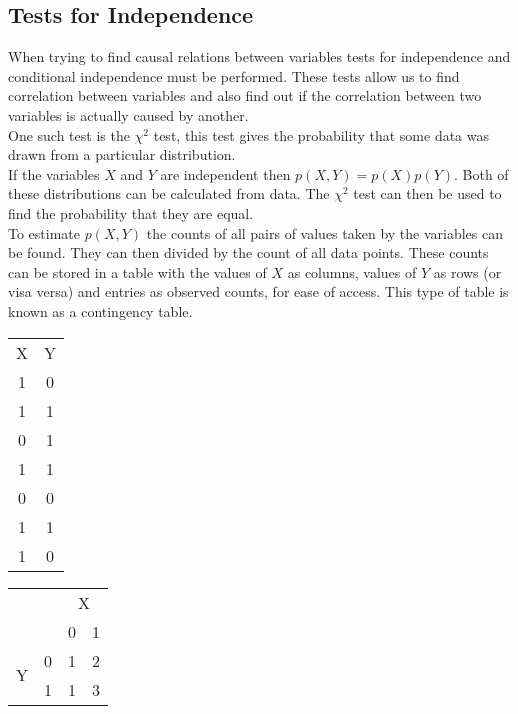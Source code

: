 \documentclass{article}
\begin{document}
\subsection{Tests for Independence}
When trying to find causal relations between variables tests for independence and conditional independence must be performed. These tests allow us to find correlation between variables and also find out if the correlation between two variables is actually caused by another.\\

One such test is the $\chi^2$ test, this test gives the probability that some data was drawn from a particular distribution.\\

If the variables $X$ and $Y$ are independent then $p(X,Y) = p(X)p(Y)$. Both of these distributions can be calculated from data. The $\chi^2$ test can then be used to find the probability that they are equal.\\

To estimate $p(X,Y)$ the counts of all pairs of values taken by the variables can be found. They can then divided by the count of all data points. These counts can be stored in a table with the values of $X$ as columns, values of $Y$ as rows (or visa versa) and entries as observed counts, for ease of access. This type of table is known as a contingency table.\\

\begin{table}[h!]
	\centering
	\begin{tabular}{c|c}
		X & Y \\ \cline{1-2}
		1 & 0 \\
		1 & 1 \\ 
		0 & 1 \\ 
		1 & 1 \\ 
		0 & 0 \\ 
		1 & 1 \\ 
		1 & 0 \\ 
	\end{tabular}
	\begin{tabular}{c|c|cc|}
		\multicolumn{2}{c}{}& \multicolumn{2}{c}{X} \\ \cline{3-4}
		\multicolumn{2}{c|}{} & 0 & 1 \\ \cline{2-4}
		\multirow{2}{*}{Y} & 0 & 1 & 2\\
		& 1 & 1 & 3 \\
		\cline{2-4} 
	\end{tabular}
\end{table}
\end{document}
